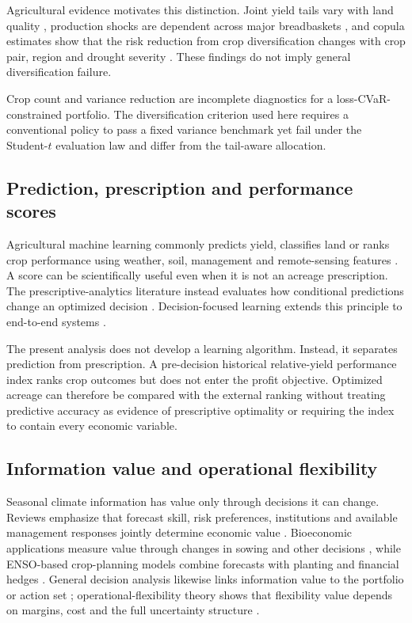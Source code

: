 Agricultural evidence motivates this distinction. Joint yield tails vary with
land quality \citep{du2018land}, production shocks are dependent across major
breadbaskets \citep{pflug2017breadbaskets}, and copula estimates show that the
risk reduction from crop diversification changes with crop pair, region and
drought severity \citep{schmitt2024drought}. These findings do not imply
general diversification failure.

Crop count and variance reduction are incomplete diagnostics for a
loss-CVaR-constrained portfolio. The diversification criterion used here
requires a conventional policy to pass a fixed variance benchmark yet fail
under the Student-\(t\) evaluation law and differ from the tail-aware
allocation.

\subsection{Prediction, prescription and performance scores}

Agricultural machine learning commonly predicts yield, classifies land or
ranks crop performance using weather, soil, management and remote-sensing
features \citep{liakos2018machine,vanklompenburg2020crop}. A score can be
scientifically useful even when it is not an acreage prescription. The
prescriptive-analytics literature instead evaluates how conditional
predictions change an optimized decision
\citep{bertsimas2020predictive,elmachtoub2022smart}. Decision-focused learning
extends this principle to end-to-end systems
\citep{mandi2023decision}.

The present analysis does not develop a learning algorithm. Instead, it
separates prediction from prescription. A pre-decision historical
relative-yield performance index ranks crop outcomes but does not enter the
profit objective. Optimized acreage can therefore be compared with the
external ranking without treating predictive accuracy as evidence of
prescriptive optimality or requiring the index to contain every economic
variable.

\subsection{Information value and operational flexibility}

Seasonal climate information has value only through decisions it can change.
Reviews emphasize that forecast skill, risk preferences, institutions and
available management responses jointly determine economic value
\citep{meza2008economic}. Bioeconomic applications measure value through
changes in sowing and other decisions \citep{anvo2021framework}, while
ENSO-based crop-planning models combine forecasts with planting and financial
hedges \citep{aitsahlia2011enso}. General decision analysis likewise links
information value to the portfolio or action set
\citep{keisler2004value,merkhofer1975value}; operational-flexibility theory
shows that flexibility value depends on margins, cost and the full uncertainty
structure \citep{vanmieghem1998investment}.

